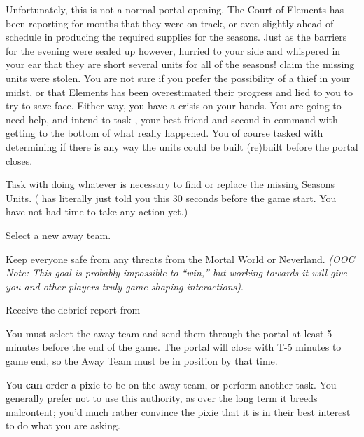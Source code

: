 \documentclass[char]{PP}
\begin{document}
Unfortunately, this is not a normal portal opening. The Court of Elements has been reporting for months that they were on track, or even slightly ahead of schedule in producing the required supplies for the seasons. Just as the barriers for the evening were sealed up however, \cEHead{} hurried to your side and whispered in your ear that they are short several units for all of the seasons! \cEHead{\They} claim\cEHead{\plural} the missing units were stolen. You are not sure if you prefer the possibility of a thief in your midst, or that Elements has been overestimated their progress and lied to you to try to save face. Either way, you have a crisis on your hands. You are going to need help, and intend to task \cSAdvisor{}, your best friend and second in command with getting to the bottom of what really happened. You of course tasked \cEHead{} with determining if there is any way the units could be built (re)built before the portal closes.

\begin{itemz}
	\item Task \cSAdvisor{} with doing whatever is necessary to find or replace the missing Seasons Units. (\cEHead{} has literally just told you this 30 seconds before the game start. You have not had time to take any action yet.)
	\item Select a new away team.
	\item Keep everyone safe from any threats from the Mortal World or Neverland. \textit{(OOC Note: This goal is probably impossible to ``win,'' but working towards it will give you and other players truly game-shaping interactions)}.
	\item Receive the debrief report from \cSPM{}
\end{itemz}

\begin{itemz}[Notes]
	\item You must select the away team and send them through the portal at least 5 minutes before the end of the game. The portal will close with T-5 minutes to game end, so the Away Team must be in position by that time.
	\item You \textbf{can} order a pixie to be on the away team, or perform another task. You generally prefer not to use this authority, as over the long term it breeds malcontent; you'd much rather convince the pixie that it is in their best interest to do what you are asking.
\end{itemz}
\end{document}
